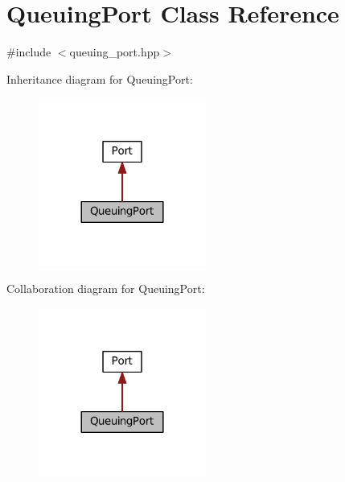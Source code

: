 \hypertarget{classQueuingPort}{}\section{Queuing\+Port Class Reference}
\label{classQueuingPort}


{\ttfamily \#include $<$queuing\+\_\+port.\+hpp$>$}



Inheritance diagram for Queuing\+Port\+:\nopagebreak
\begin{figure}[H]
\begin{center}
\leavevmode
\includegraphics[width=156pt]{classQueuingPort__inherit__graph}
\end{center}
\end{figure}


Collaboration diagram for Queuing\+Port\+:\nopagebreak
\begin{figure}[H]
\begin{center}
\leavevmode
\includegraphics[width=156pt]{classQueuingPort__coll__graph}
\end{center}
\end{figure}
